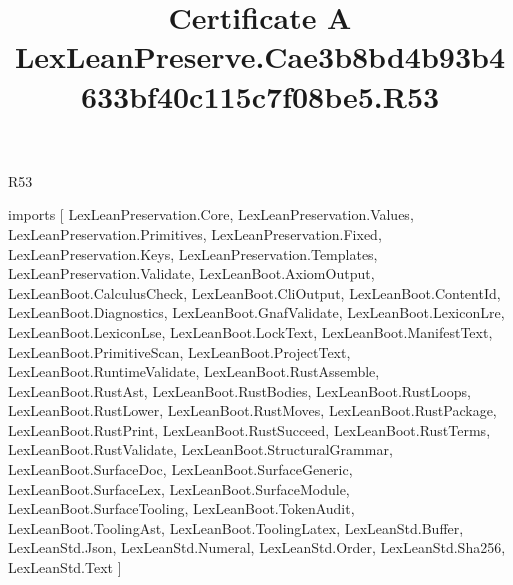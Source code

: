 \begin{lexlean}{R53}
\title{Certificate A LexLeanPreserve.Cae3b8bd4b93b4633bf40c115c7f08be5.R53}
\begin{coremodule}
imports [
  LexLeanPreservation.Core,
  LexLeanPreservation.Values,
  LexLeanPreservation.Primitives,
  LexLeanPreservation.Fixed,
  LexLeanPreservation.Keys,
  LexLeanPreservation.Templates,
  LexLeanPreservation.Validate,
  LexLeanBoot.AxiomOutput,
  LexLeanBoot.CalculusCheck,
  LexLeanBoot.CliOutput,
  LexLeanBoot.ContentId,
  LexLeanBoot.Diagnostics,
  LexLeanBoot.GnafValidate,
  LexLeanBoot.LexiconLre,
  LexLeanBoot.LexiconLse,
  LexLeanBoot.LockText,
  LexLeanBoot.ManifestText,
  LexLeanBoot.PrimitiveScan,
  LexLeanBoot.ProjectText,
  LexLeanBoot.RuntimeValidate,
  LexLeanBoot.RustAssemble,
  LexLeanBoot.RustAst,
  LexLeanBoot.RustBodies,
  LexLeanBoot.RustLoops,
  LexLeanBoot.RustLower,
  LexLeanBoot.RustMoves,
  LexLeanBoot.RustPackage,
  LexLeanBoot.RustPrint,
  LexLeanBoot.RustSucceed,
  LexLeanBoot.RustTerms,
  LexLeanBoot.RustValidate,
  LexLeanBoot.StructuralGrammar,
  LexLeanBoot.SurfaceDoc,
  LexLeanBoot.SurfaceGeneric,
  LexLeanBoot.SurfaceLex,
  LexLeanBoot.SurfaceModule,
  LexLeanBoot.SurfaceTooling,
  LexLeanBoot.TokenAudit,
  LexLeanBoot.ToolingAst,
  LexLeanBoot.ToolingLatex,
  LexLeanStd.Buffer,
  LexLeanStd.Json,
  LexLeanStd.Numeral,
  LexLeanStd.Order,
  LexLeanStd.Sha256,
  LexLeanStd.Text
]


\end{coremodule}
\end{lexlean}
